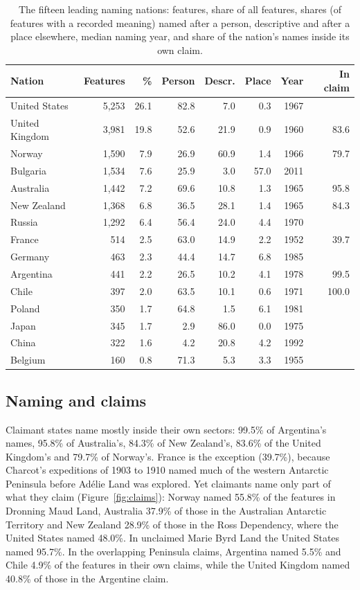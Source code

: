 \documentclass[11pt,a4paper]{article}
\begin{document}
\begin{table}[tbp]\centering\small\caption{The fifteen leading naming nations: features, share of all features, shares (of features with a recorded meaning) named after a person, descriptive and after a place elsewhere, median naming year, and share of the nation's names inside its own claim.}\label{tab:nations}\begin{tabular}{lrrrrrrr}\toprule Nation & Features & \% & Person & Descr. & Place & Year & In claim\\\midrule
United States & 5,253 & 26.1 & 82.8 & 7.0 & 0.3 & 1967 & \\
United Kingdom & 3,981 & 19.8 & 52.6 & 21.9 & 0.9 & 1960 & 83.6\\
Norway & 1,590 & 7.9 & 26.9 & 60.9 & 1.4 & 1966 & 79.7\\
Bulgaria & 1,534 & 7.6 & 25.9 & 3.0 & 57.0 & 2011 & \\
Australia & 1,442 & 7.2 & 69.6 & 10.8 & 1.3 & 1965 & 95.8\\
New Zealand & 1,368 & 6.8 & 36.5 & 28.1 & 1.4 & 1965 & 84.3\\
Russia & 1,292 & 6.4 & 56.4 & 24.0 & 4.4 & 1970 & \\
France & 514 & 2.5 & 63.0 & 14.9 & 2.2 & 1952 & 39.7\\
Germany & 463 & 2.3 & 44.4 & 14.7 & 6.8 & 1985 & \\
Argentina & 441 & 2.2 & 26.5 & 10.2 & 4.1 & 1978 & 99.5\\
Chile & 397 & 2.0 & 63.5 & 10.1 & 0.6 & 1971 & 100.0\\
Poland & 350 & 1.7 & 64.8 & 1.5 & 6.1 & 1981 & \\
Japan & 345 & 1.7 & 2.9 & 86.0 & 0.0 & 1975 & \\
China & 322 & 1.6 & 4.2 & 20.8 & 4.2 & 1992 & \\
Belgium & 160 & 0.8 & 71.3 & 5.3 & 3.3 & 1955 & \\
\bottomrule\end{tabular}\end{table}

\subsection{Naming and claims}
Claimant states name mostly inside their own sectors: 99.5\% of Argentina's names, 95.8\% of Australia's, 84.3\% of New Zealand's, 83.6\% of the United Kingdom's and 79.7\% of Norway's. France is the exception (39.7\%), because Charcot's expeditions of 1903 to 1910 named much of the western Antarctic Peninsula before Ad\'elie Land was explored. Yet claimants name only part of what they claim (Figure~\ref{fig:claims}): Norway named 55.8\% of the features in Dronning Maud Land, Australia 37.9\% of those in the Australian Antarctic Territory and New Zealand 28.9\% of those in the Ross Dependency, where the United States named 48.0\%. In unclaimed Marie Byrd Land the United States named 95.7\%. In the overlapping Peninsula claims, Argentina named 5.5\% and Chile 4.9\% of the features in their own claims, while the United Kingdom named 40.8\% of those in the Argentine claim.
\end{document}
